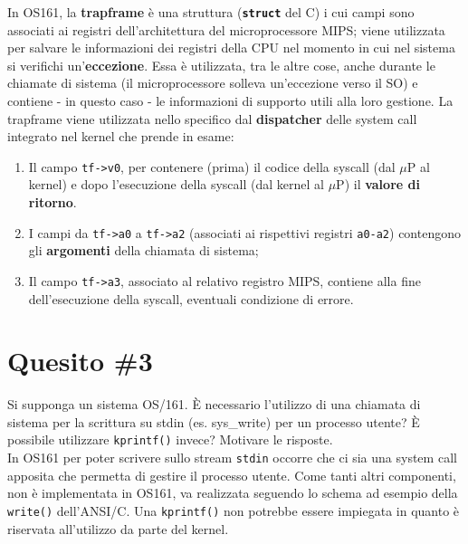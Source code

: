 \documentclass[12pt]{article}
\begin{document}
\noindent
In OS161, la \textbf{trapframe} \`e una struttura (\textbf{\texttt{struct}} del C) i cui campi sono associati ai registri dell'architettura del microprocessore MIPS; viene utilizzata per salvare le informazioni dei registri della CPU nel momento in cui nel sistema si verifichi un'\textbf{eccezione}.  Essa \`e utilizzata, tra le altre cose, anche durante le chiamate di sistema (il microprocessore solleva un'eccezione verso il SO) e contiene - in questo caso - le informazioni di supporto utili alla loro gestione. La trapframe viene utilizzata nello specifico dal \textbf{dispatcher} delle system call integrato nel kernel che prende in esame: 
\begin{enumerate}
    \item Il campo \texttt{tf->v0}, per contenere (prima) il codice della syscall (dal $\mu$P al kernel) e dopo l'esecuzione della syscall (dal kernel al $\mu$P) il \textbf{valore di ritorno}.
    \item I campi da \texttt{tf->a0} a \texttt{tf->a2} (associati ai rispettivi registri \texttt{a0-a2}) contengono gli \textbf{argomenti} della chiamata di sistema; 
    \item Il campo \texttt{tf->a3}, associato al relativo registro MIPS, contiene alla fine dell'esecuzione della syscall, eventuali condizione di errore.
\end{enumerate} 

\section{Quesito \#3}
{\color{blue}
    Si supponga un sistema OS/161. \`E necessario l'utilizzo di una chiamata di sistema per la
scrittura su stdin (es. sys\_write) per un processo utente? \`E  possibile utilizzare \texttt{kprintf()}
invece? Motivare le risposte.
}\\

\noindent
In \textsc{OS161} per poter scrivere sullo stream \texttt{stdin} occorre che ci sia una system call apposita che permetta di gestire il processo utente. Come tanti altri componenti, non \`e implementata in OS161, va realizzata seguendo lo schema ad esempio della \texttt{write()} dell'ANSI/C. Una \texttt{kprintf()} non potrebbe essere impiegata in quanto \`e riservata all'utilizzo da parte del kernel.
\end{document}

